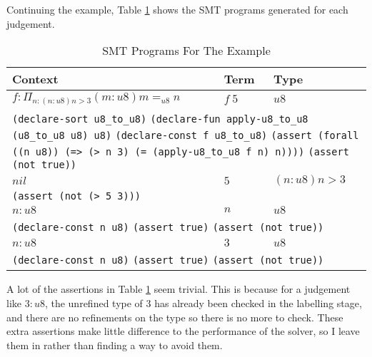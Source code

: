 Continuing the example, Table \ref{tab:example_smt} shows the SMT programs generated for each
judgement.
\begin{table}
    \centering
    \begin{tabular}{|l|l|l|}
        \hline
        \textbf{Context} & \textbf{Term} & \textbf{Type}\\\hline
        $f: \Pi_{n: (n:u8) n > 3} (m: u8) m =_{u8} n$ & $f\ 5$ & $u8$\\\hline
        \multicolumn{3}{|p{1.0\textwidth}|}{
            \texttt{(declare-sort u8\_to\_u8)}\newline
            \texttt{(declare-fun apply-u8\_to\_u8 (u8\_to\_u8 u8) u8)}\newline
            \texttt{(declare-const f u8\_to\_u8)}\newline
            \texttt{(assert (forall ((n u8)) (=> (> n 3) (= (apply-u8\_to\_u8 f n) n))))}\newline
            \texttt{(assert (not true))}
        }\\\hline
        $nil$ & $5$ & $(n: u8) n > 3$\\\hline
        \multicolumn{3}{|p{1.0\textwidth}|}{
            \texttt{(assert (not (> 5 3)))}
        }\\\hline
        $n: u8$ & $n$ & $u8$\\\hline
        \multicolumn{3}{|p{1.0\textwidth}|}{
            \texttt{(declare-const n u8)}\newline
            \texttt{(assert true)}\newline
            \texttt{(assert (not true))}
        }\\\hline
        $n: u8$ & $3$ & $u8$\\\hline
        \multicolumn{3}{|p{1.0\textwidth}|}{
            \texttt{(declare-const n u8)}\newline
            \texttt{(assert true)}\newline
            \texttt{(assert (not true))}
        }\\\hline
    \end{tabular}
    \caption{SMT Programs For The Example}
    \label{tab:example_smt}
\end{table}
A lot of the assertions in Table \ref{tab:example_smt} seem trivial.
This is because for a judgement like $3:u8$, the unrefined type of $3$ has already been checked in
the labelling stage, and there are no refinements on the type so there is no more to check.
These extra assertions make little difference to the performance of the solver, so I leave them
in rather than finding a way to avoid them.

